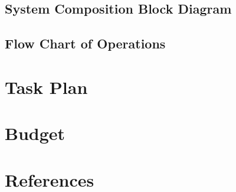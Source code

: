 \documentclass[a4paper,10pt]{article}
\begin{document}
\subsection{System Composition Block Diagram}
\subsection{Flow Chart of Operations}
\section{Task Plan}

\section{Budget}

\section{References}
\printbibliography
\end{document}
